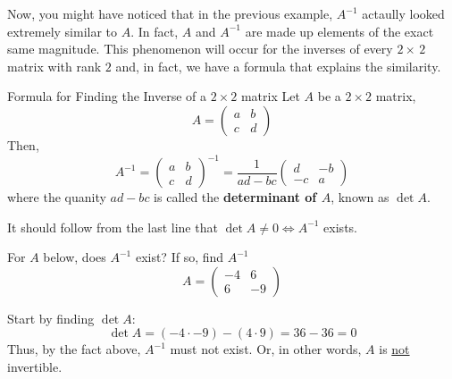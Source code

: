 Now, you might have noticed that in the previous example, $A^{-1}$ actaully looked extremely similar to $A$. In fact, $A$ and $A^{-1}$ are made up elements of the exact same magnitude. This phenomenon will occur for the inverses of every $2\times\,2$ matrix with rank $2$ and, in fact, we have a formula that explains the similarity. 

\begin{impbox}{Formula for Finding the Inverse of a $2 \times 2$ matrix}{}
    Let $A$ be a $2 \times 2$ matrix, 
    \[A = \begin{pmatrix}
        a & b \\ c & d
    \end{pmatrix}\]
    Then, 
    \[
        A^{-1} = \begin{pmatrix}
            a & b \\ c & d
        \end{pmatrix}^{-1}
        = 
        \frac{1}{ad - bc}\begin{pmatrix}
            d & -b \\
            -c & a
        \end{pmatrix}
    \]
    where the quanity $ad-bc$ is called the \textbf{determinant of $A$}, known as $\det{A}$.
\end{impbox}
It should follow from the last line that $\det{A} \neq 0 \Leftrightarrow A^{-1}$ exists.

\begin{example}{}{}
    For $A$ below, does $A^{-1}$ exist? If so, find $A^{-1}$
    \[A = \begin{pmatrix}
        -4 & 6 \\ 6 & -9
    \end{pmatrix}\] 
    \begin{solution}
        Start by finding $\det{A}$: 
        \[
            \det{A} = \left(-4 \cdot -9\right) - \left(4 \cdot 9\right) = 36 - 36 = 0
        \]
        Thus, by the fact above, $A^{-1}$ must not exist. Or, in other words, $A$ is \underline{not} invertible.
    \end{solution}
\end{example}

